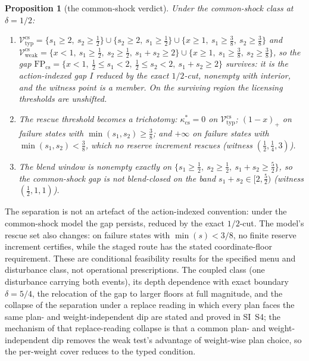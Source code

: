 \documentclass[preprint,11pt,authoryear]{elsarticle}
\newtheorem{proposition}{Proposition}
\theoremstyle{definition}
\theoremstyle{remark}
\newcommand{\Vtyp}{\mathcal{V}_{\mathrm{typ}}}
\newcommand{\Vweak}{\mathcal{V}_{\mathrm{weak}}}
\begin{document}
\begin{proposition}[the common-shock verdict]\label{prop:commonshock}
Under the common-shock class at $\delta=1/2$:
\begin{enumerate}[label=\textup{(\roman*)},leftmargin=2em]
\item $\Vtyp^{\mathrm{cs}}=\{s_1\ge2,\ s_2\ge\tfrac12\}\cup\{s_2\ge2,\ s_1\ge\tfrac12\}\cup\{x\ge1,\ s_1\ge\tfrac38,\ s_2\ge\tfrac38\}$ and
$\Vweak^{\mathrm{cs}}=\{x<1,\ s_1\ge\tfrac12,\ s_2\ge\tfrac12,\ s_1+s_2\ge2\}\cup\{x\ge1,\ s_1\ge\tfrac38,\ s_2\ge\tfrac38\}$, so the gap
$\mathrm{FP}_{\mathrm{cs}}=\{x<1,\ \tfrac12\le s_1<2,\ \tfrac12\le s_2<2,\ s_1+s_2\ge2\}$
survives: it is the action-indexed gap $I$ reduced by the exact $1/2$-cut, nonempty with interior, and the witness point is a member. On the surviving region the licensing thresholds are unshifted.
\item The rescue threshold becomes a trichotomy: $\kappa^*_{\mathrm{cs}}=0$ on $\Vtyp^{\mathrm{cs}}$; $(1-x)_+$ on failure states with $\min(s_1,s_2)\ge\tfrac38$; and $+\infty$ on failure states with $\min(s_1,s_2)<\tfrac38$, which no reserve increment rescues (witness $(\tfrac12,\tfrac14,3)$).
\item The blend window is nonempty exactly on $\{s_1\ge\tfrac12,\ s_2\ge\tfrac12,\ s_1+s_2\ge\tfrac52\}$, so the common-shock gap is not blend-closed on the band $s_1+s_2\in[2,\tfrac52)$ (witness $(\tfrac12,1,1)$).
\end{enumerate}
\end{proposition}

The separation is not an artefact of the action-indexed convention: under the common-shock model the gap persists, reduced by the exact $1/2$-cut. The model's rescue set also changes: on failure states with $\min(s)<3/8$, no finite reserve increment certifies, while the staged route has the stated coordinate-floor requirement. These are conditional feasibility results for the specified menu and disturbance class, not operational prescriptions. The coupled class (one disturbance carrying both events), its depth dependence with exact boundary $\delta=5/4$, the relocation of the gap to larger floors at full magnitude, and the collapse of the separation under a replace reading in which every plan faces the same plan- and weight-independent dip are stated and proved in SI~S4; the mechanism of that replace-reading collapse is that a common plan- and weight-independent dip removes the weak test's advantage of weight-wise plan choice, so the per-weight cover reduces to the typed condition.
\end{document}
